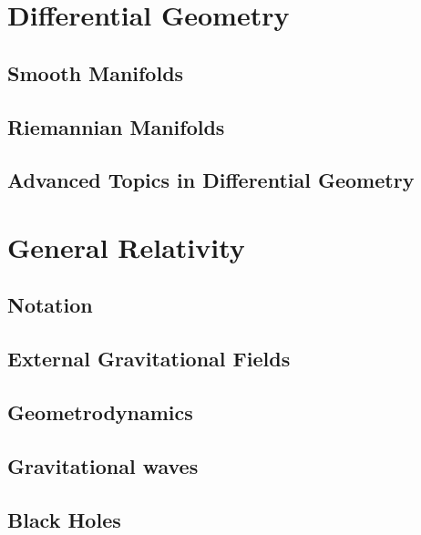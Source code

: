 \documentclass[a4paper, 12pt]{book}
\begin{document}
\part{Differential Geometry}
\pagestyle{body}

\chapter{Smooth Manifolds}


\chapter{Riemannian Manifolds}


\chapter{Advanced Topics in Differential Geometry}


\part{General Relativity}
\pagestyle{body}

\pagestyle{notation}
\chapter*{Notation}


\pagestyle{body}
\chapter{External Gravitational Fields}


\chapter{Geometrodynamics}


\chapter{Gravitational waves}


%

\chapter{Black Holes}

\end{document}
